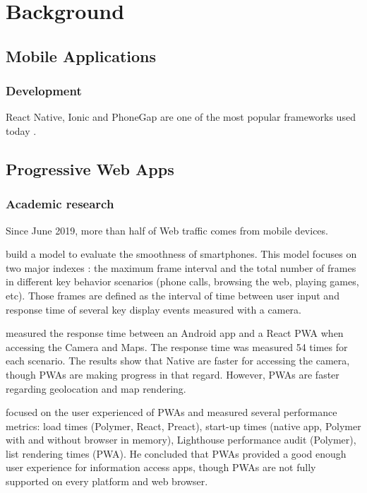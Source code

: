 \chapter{Background}
\section{Mobile Applications}
\subsection{Development}

React Native, Ionic and PhoneGap are one of the most popular frameworks used today \cite{CrossPlatform_study}.

\section{Progressive Web Apps}
\subsection{Academic research}

Since June 2019, more than half of Web traffic comes from mobile devices. \cite{WebTrafficData}

    \cite{smoothnessQoE} build a model to evaluate the smoothness of smartphones. This model focuses on two major indexes : the maximum frame interval and the total number of frames in different key behavior scenarios (phone calls, browsing the web, playing games, etc). Those frames are defined as the interval of time between user input and response time of several key display events measured with a camera. %
    
    \cite{PWAbc_responsetime} measured the response time between an Android app and a React PWA when accessing the Camera and Maps. The response time was measured 54 times for each scenario. The results show that Native are faster for accessing the camera, though PWAs are making progress in that regard. However, PWAs are faster regarding geolocation and map rendering.
    
    \cite{YbergViktor2018NPaU} focused on the user experienced of PWAs and measured several performance metrics: load times (Polymer, React, Preact), start-up times (native app, Polymer with and without browser in memory), Lighthouse performance audit (Polymer), list rendering times (PWA). He concluded that PWAs provided a good enough user experience for information access apps, though PWAs are not fully supported on every platform and web browser.
    
